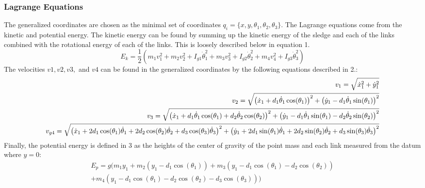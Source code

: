 \documentclass{article}
\begin{document}
\subsubsection{Lagrange Equations}
The generalized coordinates are chosen as the minimal set of coordinates $q_i = \{ x,y,\theta_1,\theta_2,\theta_3 \} $. The Lagrange equations come from the kinetic and potential energy. The kinetic energy can be found by summing up the kinetic energy of the sledge and each of the links combined with the rotational energy of each of the links. This is loosely described below in equation 1.
\begin{equation}\label{Kinetic Energy Equation}
	E_k = \frac{1}{2} \left( m_1 v_1^2 + m_2 v_2^2 + I_{g1} \dot{\theta}_1^2 + m_3 v_3^2 + I_{g2} \dot{\theta}_2^2 + m_4 v_4^2 + I_{g3} \dot{\theta}_3^2 \right) 
\end{equation}
The velocities $v1, v2, v3,$ and $v4$ can be found in the generalized coordinates by the following equations described in 2.:
\begin{equation}
	\hskip-0.0cm\begin{split}
		v_1 = \sqrt{\dot{x}_1^2 + \dot{y}_1^2} \\
		v_2 = \sqrt{\left( \dot{x}_1 + d_1 \dot{\theta}_1 \cos(\theta_1) \right)^2 + \left( \dot{y}_1 - d_1 \dot{\theta}_1 \sin(\theta_1) \right)^2}\\
		v_3 = \sqrt{\left( \dot{x}_1 + d_1 \dot{\theta}_1 \cos(\theta_1) + d_2 \dot{\theta}_2 \cos(\theta_2) \right)^2 + \left( \dot{y}_1 - d_1 \dot{\theta}_1 \sin(\theta_1) - d_2 \dot{\theta}_2 \sin(\theta_2) \right)^2}\\		
		v_{g4} = \sqrt{\left( \dot{x}_1 + 2d_1 \cos(\theta_1) \dot{\theta}_1 + 2d_2 \cos(\theta_2) \dot{\theta}_2 + d_3 \cos(\theta_3) \dot{\theta}_3 \right)^2 + \left( \dot{y}_1 + 2d_1 \sin(\theta_1) \dot{\theta}_1 + 2d_2 \sin(\theta_2) \dot{\theta}_2 + d_3 \sin(\theta_3) \dot{\theta}_3 \right)^2}		
	\end{split}
\end{equation}
Finally, the potential energy is defined in 3 as the heights of the center of gravity of the point mass and each link measured from the datum where $y=0$:
\begin{equation}
	\begin{split}
			E_p = g ( m_1 y_1 + m_2 \left( y_1 - d_1 \cos(\theta_1) \right) + m_3 \left( y_1 - d_1 \cos(\theta_1) - d_2 \cos(\theta_2) \right) \\
		+ m_4 \left( y_1 - d_1 \cos(\theta_1) - d_2 \cos(\theta_2) - d_3 \cos(\theta_3) \right) )	
	\end{split}
\end{equation}
\end{document}

